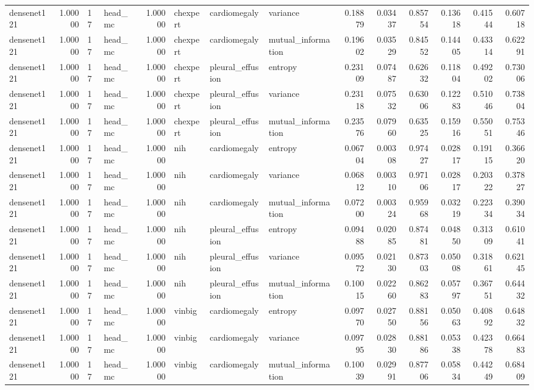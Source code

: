 \begin{tabular}{lrllrlllrrrrrr}
densenet121 & 1.00000 & 17 & head\_mc & 1.00000 & chexpert & cardiomegaly & variance & 0.18879 & 0.03437 & 0.85754 & 0.13618 & 0.41544 & 0.60718 \\
densenet121 & 1.00000 & 17 & head\_mc & 1.00000 & chexpert & cardiomegaly & mutual\_information & 0.19602 & 0.03529 & 0.84552 & 0.14405 & 0.43314 & 0.62291 \\
densenet121 & 1.00000 & 17 & head\_mc & 1.00000 & chexpert & pleural\_effusion & entropy & 0.23109 & 0.07487 & 0.62632 & 0.11804 & 0.49202 & 0.73006 \\
densenet121 & 1.00000 & 17 & head\_mc & 1.00000 & chexpert & pleural\_effusion & variance & 0.23118 & 0.07532 & 0.63006 & 0.12283 & 0.51046 & 0.73804 \\
densenet121 & 1.00000 & 17 & head\_mc & 1.00000 & chexpert & pleural\_effusion & mutual\_information & 0.23576 & 0.07960 & 0.63525 & 0.15916 & 0.55051 & 0.75346 \\
densenet121 & 1.00000 & 17 & head\_mc & 1.00000 & nih & cardiomegaly & entropy & 0.06704 & 0.00308 & 0.97427 & 0.02817 & 0.19115 & 0.36620 \\
densenet121 & 1.00000 & 17 & head\_mc & 1.00000 & nih & cardiomegaly & variance & 0.06812 & 0.00310 & 0.97106 & 0.02817 & 0.20322 & 0.37827 \\
densenet121 & 1.00000 & 17 & head\_mc & 1.00000 & nih & cardiomegaly & mutual\_information & 0.07200 & 0.00324 & 0.95968 & 0.03219 & 0.22334 & 0.39034 \\
densenet121 & 1.00000 & 17 & head\_mc & 1.00000 & nih & pleural\_effusion & entropy & 0.09488 & 0.02085 & 0.87481 & 0.04850 & 0.31309 & 0.61041 \\
densenet121 & 1.00000 & 17 & head\_mc & 1.00000 & nih & pleural\_effusion & variance & 0.09572 & 0.02130 & 0.87303 & 0.05008 & 0.31861 & 0.62145 \\
densenet121 & 1.00000 & 17 & head\_mc & 1.00000 & nih & pleural\_effusion & mutual\_information & 0.10015 & 0.02260 & 0.86283 & 0.05797 & 0.36751 & 0.64432 \\
densenet121 & 1.00000 & 17 & head\_mc & 1.00000 & vinbig & cardiomegaly & entropy & 0.09770 & 0.02750 & 0.88156 & 0.05063 & 0.40892 & 0.64832 \\
densenet121 & 1.00000 & 17 & head\_mc & 1.00000 & vinbig & cardiomegaly & variance & 0.09795 & 0.02830 & 0.88186 & 0.05338 & 0.42378 & 0.66483 \\
densenet121 & 1.00000 & 17 & head\_mc & 1.00000 & vinbig & cardiomegaly & mutual\_information & 0.10039 & 0.02991 & 0.87706 & 0.05834 & 0.44249 & 0.68409 \\

\end{tabular}
